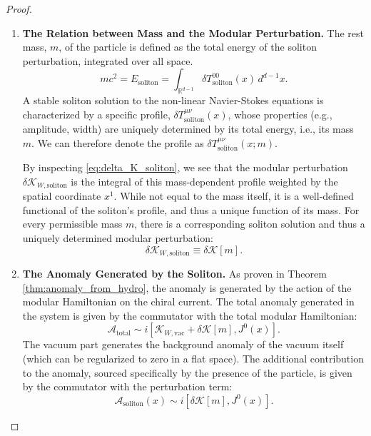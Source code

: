 \documentclass[11pt, letterpaper]{report}
\theoremstyle{plain} %
\theoremstyle{definition} %
\theoremstyle{remark} %
\newcommand{\ModularK}{\mathcal{K}}
\begin{document}
\begin{proof}
\begin{enumerate}
    \item \textbf{The Relation between Mass and the Modular Perturbation.}
    The rest mass, $m$, of the particle is defined as the total energy of the soliton perturbation, integrated over all space.
    \begin{equation}
        m c^2 = E_{\text{soliton}} = \int_{\mathbb{R}^{d-1}} \delta T^{00}_{\text{soliton}}(x) \, d^{d-1}x.
        \label{eq:mass_as_soliton_energy}
    \end{equation}
    A stable soliton solution to the non-linear Navier-Stokes equations is characterized by a specific profile, $\delta T^{\mu\nu}_{\text{soliton}}(x)$, whose properties (e.g., amplitude, width) are uniquely determined by its total energy, i.e., its mass $m$. We can therefore denote the profile as $\delta T^{\mu\nu}_{\text{soliton}}(x; m)$.

    By inspecting \cref{eq:delta_K_soliton}, we see that the modular perturbation $\delta\ModularK_{W, \text{soliton}}$ is the integral of this mass-dependent profile weighted by the spatial coordinate $x^1$. While not equal to the mass itself, it is a well-defined functional of the soliton's profile, and thus a unique function of its mass. For every permissible mass $m$, there is a corresponding soliton solution and thus a uniquely determined modular perturbation:
    \begin{equation}
        \delta\ModularK_{W, \text{soliton}} \equiv \delta\ModularK[m].
    \end{equation}

    \item \textbf{The Anomaly Generated by the Soliton.}
    As proven in Theorem \ref{thm:anomaly_from_hydro}, the anomaly is generated by the action of the modular Hamiltonian on the chiral current. The total anomaly generated in the system is given by the commutator with the total modular Hamiltonian:
    $$ \mathcal{A}_{\text{total}} \sim i[\ModularK_{W, \text{vac}} + \delta\ModularK[m], J^0(x)]. $$
    The vacuum part generates the background anomaly of the vacuum itself (which can be regularized to zero in a flat space). The additional contribution to the anomaly, sourced specifically by the presence of the particle, is given by the commutator with the perturbation term:
    \begin{equation}
        \mathcal{A}_{\text{soliton}}(x) \sim i[\delta\ModularK[m], J^0(x)].
    \end{equation}


\end{enumerate}
\end{proof}
\end{document}
